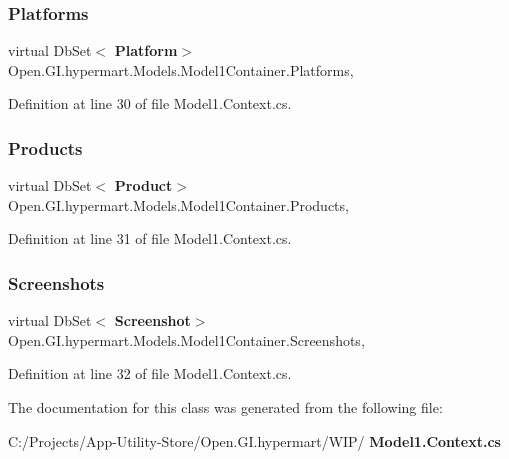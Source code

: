 \subsubsection{Platforms}
{\footnotesize\ttfamily virtual Db\+Set$<$\textbf{ Platform}$>$ Open.\+G\+I.\+hypermart.\+Models.\+Model1\+Container.\+Platforms\hspace{0.3cm}{\ttfamily [get]}, {\ttfamily [set]}}



Definition at line 30 of file Model1.\+Context.\+cs.

\mbox{\label{class_open_1_1_g_i_1_1hypermart_1_1_models_1_1_model1_container_a3152c9cb162bad57e707fb1a6b48152c}} 
\subsubsection{Products}
{\footnotesize\ttfamily virtual Db\+Set$<$\textbf{ Product}$>$ Open.\+G\+I.\+hypermart.\+Models.\+Model1\+Container.\+Products\hspace{0.3cm}{\ttfamily [get]}, {\ttfamily [set]}}



Definition at line 31 of file Model1.\+Context.\+cs.

\mbox{\label{class_open_1_1_g_i_1_1hypermart_1_1_models_1_1_model1_container_a16840948ed271ebac66728f3398b6696}} 
\subsubsection{Screenshots}
{\footnotesize\ttfamily virtual Db\+Set$<$\textbf{ Screenshot}$>$ Open.\+G\+I.\+hypermart.\+Models.\+Model1\+Container.\+Screenshots\hspace{0.3cm}{\ttfamily [get]}, {\ttfamily [set]}}



Definition at line 32 of file Model1.\+Context.\+cs.



The documentation for this class was generated from the following file\+:\begin{DoxyCompactItemize}
\item 
C\+:/\+Projects/\+App-\/\+Utility-\/\+Store/\+Open.\+G\+I.\+hypermart/\+W\+I\+P/\textbf{ Model1.\+Context.\+cs}\end{DoxyCompactItemize}
